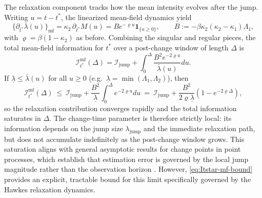\documentclass{article}
\theoremstyle{plain}
\theoremstyle{definition}
\newcommand{\1}{\mathbf{1}}
\begin{document}
    The relaxation component tracks how the mean intensity evolves after the jump. Writing $u=t-t^\ast$, the linearized mean-field dynamics yield
    \[
    \{\partial_{t^\ast}\bar\lambda(u)\}_{\text{mf}}
    =\kappa_2\,\partial_{t^\ast}M(u)
    =Be^{-\varrho u}\1_{\{u\ge 0\}},
    \qquad
    B:=-\beta\kappa_2(\kappa_2-\kappa_1)\Lambda_1,
    \]
    with $\varrho=\beta(1-\kappa_2)$ as before. Combining the singular and regular pieces, the total mean-field information for $t^\ast$ over a post-change window of length $\Delta$ is
    \begin{equation}
    \label{eq:Itstar-mf}
    \mathcal I_{t^\ast}^{\mathrm{mf}}(\Delta)
    = \mathcal{I}_{\text{jump}} + \int_0^\Delta \frac{B^2 e^{-2\varrho u}}{\bar\lambda(u)} du.
    \end{equation}
    If $\underline\lambda\le \bar\lambda(u)$ for all $u\ge 0$ (e.g.\ $\underline\lambda=\min(\Lambda_1,\Lambda_2)$), then
    \begin{equation}
    \label{eq:Itstar-mf-bound}
    \mathcal I_{t^\ast}^{\mathrm{mf}}(\Delta)
    \ \le\ 
    \mathcal{I}_{\text{jump}} + \frac{B^2}{\underline\lambda}\int_0^\Delta e^{-2\varrho u} du
    \ =\
    \mathcal{I}_{\text{jump}} + \frac{B^2}{2\varrho \underline\lambda}(1-e^{-2\varrho\Delta}),
    \end{equation}
    so the relaxation contribution converges rapidly and the total information saturates in $\Delta$. The change-time parameter is therefore strictly local: its information depends on the jump size $\lambda_{\mathrm{jump}}$ and the immediate relaxation path, but does not accumulate indefinitely as the post-change window grows. This saturation aligns with general asymptotic results for change points in point processes, which establish that estimation error is governed by the local jump magnitude rather than the observation horizon \cite{ibragimov2013statistical, dachian2008goodness}. However, \eqref{eq:Itstar-mf-bound} provides an explicit, tractable bound for this limit specifically governed by the Hawkes relaxation dynamics.
    
\end{document}
